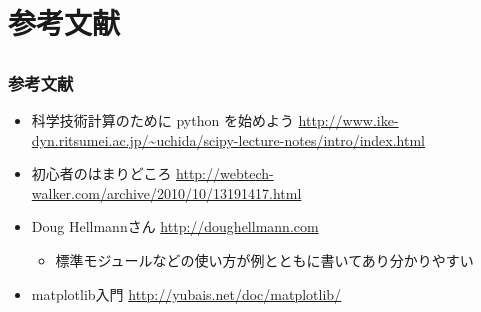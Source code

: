 \section{参考文献}
\subsection*{\redm\whiteb\greenb}

\begin{frame}[t]
\frametitle{参考文献}
\begin{itemize}
\item 科学技術計算のために python を始めよう
  \url{http://www.ike-dyn.ritsumei.ac.jp/~uchida/scipy-lecture-notes/intro/index.html}
\item 初心者のはまりどころ \url{http://webtech-walker.com/archive/2010/10/13191417.html}
\item Doug Hellmannさん \url{http://doughellmann.com}
  \begin{itemize}
  \item 標準モジュールなどの使い方が例とともに書いてあり分かりやすい
  \end{itemize}
\item matplotlib入門 \url{http://yubais.net/doc/matplotlib/}
\end{itemize}
\end{frame}



